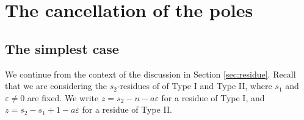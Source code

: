 \documentclass[11pt]{amsart}
\newtheorem{proposition}[theorem]{Proposition}
\numberwithin{theorem}{section}
\numberwithin{equation}{section}
\theoremstyle{remark}
\theoremstyle{definition}
\newcommand{\ignore}[1]{{}}
\begin{document}
\section{The cancellation of the poles} \label{sec:poles}

\ignore{
\subsection{Some easy opening}

The goal is to correct the error in Sec. 5.3 about the $s_2$-residues not from $M(w_2,\tilde\lambda_2)$. The following proposition provides a helpful starting point.

\begin{proposition} \label{prop:lambda2}
For $w_1,w_2 \in W$, let
\begin{equation} \label{eq:summand}
I(w_1,w_2) = \frac{e^{\langle C, w_1\lambda_1+w_2\lambda_2 \rangle}}{\prod_{\alpha \in \Delta}\langle \alpha^\vee, w_1\lambda_1 + w_2\lambda_2 \rangle} M(w_1,\lambda_1)M(w_2,\lambda_2),
\end{equation}
and similarly for $\tilde I(w_1,w_2)$ with $\lambda_i$ replaced with $\tilde\lambda_i$.
Then both $I(w_1,w_2)$ and $\tilde I(w_1,w_2)$ are nonzero (as a function of $s_1,s_2$) only if $w_2(i) < w_2(j)$ for all $i<j$ in the same block.
\end{proposition}
\begin{proof}
Suppose otherwise, so that there exists $i<j$ in the same block such that $w_2(i) > w_2(j)$. Then there exists $i \leq l < j$ such that $w_2(l) > w_2(l+1)$ so that $M(w_2,\lambda_2)=M(w_2,\tilde\lambda_2)$ has the factor $c(\langle \alpha^\vee_l, \tilde\lambda_2\rangle)$. But this vanishes, since $\langle \alpha^\vee_l, \tilde\lambda_2\rangle=-1$.
\end{proof}
Henceforth one may assume that $w_2 \in W$ preserves the order within each block. Although we do not cite this fact directly below, it is a useful constraint to keep in mind for following our computations.
}

\subsection{The simplest case}

We continue from the context of the discussion in Section \ref{sec:residue}. Recall that we are considering the $s_2$-residues of of Type I and Type II, where $s_1$ and $\varepsilon \neq 0$ are fixed. We write $z=s_2-n-a\varepsilon$ for a residue of Type I, and $z = s_2-s_1+1-a\varepsilon$ for a residue of Type II.
\end{document}
